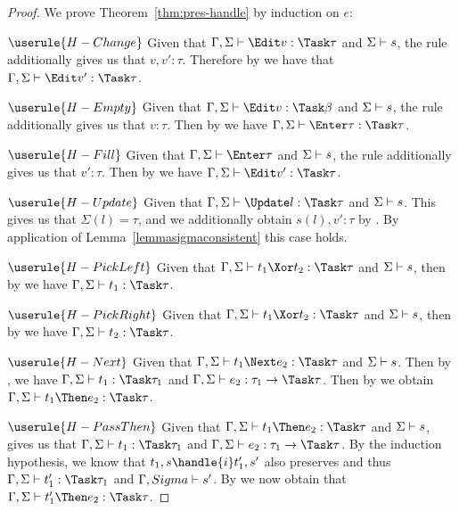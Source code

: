 \begin{proof}
  We prove Theorem~\ref{thm:pres-handle} by induction on $e$:

  \case
    {$\userule{H-Change}$}
    {Given that $\Gamma,\Sigma\infers\Edit v:\Task\tau$ and $\Sigma\vdash s$, the  rule additionally gives us that $v,v':\tau$. Therefore by  we have that $\Gamma,\Sigma\infers\Edit v':\Task\tau$.}

  \case
    {$\userule{H-Empty}$}
    {Given that $\Gamma,\Sigma\infers\Edit v:\Task\beta$ and $\Sigma\vdash s$, the  rule additionally gives us that $v:\tau$.
    Then by  we have $\Gamma,\Sigma\infers\Enter \tau:\Task\tau$.}

  \case
    {$\userule{H-Fill}$}
    {Given that $\Gamma,\Sigma\infers\Enter\tau$ and $\Sigma\vdash s$, the  rule additionally gives us that $v':\tau$.
    Then by  we have $\Gamma,\Sigma\infers \Edit v':\Task\tau$.}

  \case
    {$\userule{H-Update}$}
    {Given that $\Gamma,\Sigma\infers\Update l:\Task\tau$ and $\Sigma\vdash s$.
    This gives us that $\Sigma(l)=\tau$, and we additionally obtain $s(l),v':\tau$ by .
    By application of Lemma~\ref{lemmasigmaconsistent} this case holds.}

  \case
    {$\userule{H-PickLeft}$}
    {Given that $\Gamma,\Sigma\infers t_1\Xor t_2:\Task\tau$ and $\Sigma\vdash s$,
    then by  we have $\Gamma,\Sigma\infers t_1:\Task \tau$.}

  \case
    {$\userule{H-PickRight}$}
    {Given that $\Gamma,\Sigma\infers t_1\Xor t_2:\Task\tau$ and $\Sigma\vdash s$,
    then by  we have $\Gamma,\Sigma\infers t_2:\Task \tau$.}

  \case
    {$\userule{H-Next}$}
    {Given that $\Gamma,\Sigma\infers t_1\Next e_2 :\Task\tau$ and $\Sigma\vdash s$.
    Then by , we have $\Gamma,\Sigma\infers t_1:\Task\tau_1$ and $\Gamma,\Sigma\infers e_2:\tau_1\to\Task\tau$.
    Then by  we obtain $\Gamma,\Sigma\infers t_1\Then e_2:\Task\tau$.}

  \case
    {$\userule{H-PassThen}$}
    {Given that $\Gamma,\Sigma\infers t_1\Then e_2:\Task\tau$ and $\Sigma\vdash s$,
     gives us that $\Gamma,\Sigma\infers t_1:\Task\tau_1$ and $\Gamma,\Sigma\infers e_2:\tau_1\to\Task\tau$.
    By the induction hypothesis, we know that $t_1,s\handle{i}t_1',s'$ also preserves and thus $\Gamma,\Sigma\infers t_1':\Task\tau_1$ and $\Gamma,Sigma\vdash s'$.
    By  we now obtain that $\Gamma,\Sigma\infers t_1'\Then e_2:\Task\tau$.}


\end{proof}
